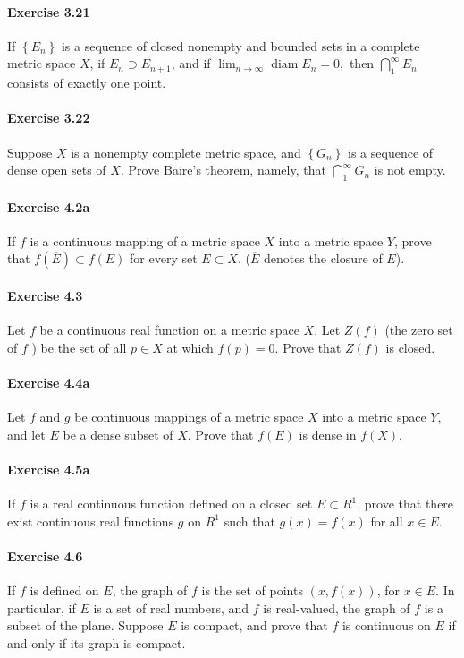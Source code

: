 \documentclass{article}
\begin{document}
\paragraph{Exercise 3.21} If $\left\{E_{n}\right\}$ is a sequence of closed nonempty and bounded sets in a complete metric space $X$, if $E_{n} \supset E_{n+1}$, and if $\lim _{n \rightarrow \infty} \operatorname{diam} E_{n}=0,$ then $\bigcap_{1}^{\infty} E_{n}$ consists of exactly one point.

\paragraph{Exercise 3.22} Suppose $X$ is a nonempty complete metric space, and $\left\{G_{n}\right\}$ is a sequence of dense open sets of $X$. Prove Baire's theorem, namely, that $\bigcap_{1}^{\infty} G_{n}$ is not empty.

\paragraph{Exercise 4.2a} If $f$ is a continuous mapping of a metric space $X$ into a metric space $Y$, prove that $f(\overline{E}) \subset \overline{f(E)}$ for every set $E \subset X$. ($\overline{E}$ denotes the closure of $E$).

\paragraph{Exercise 4.3} Let $f$ be a continuous real function on a metric space $X$. Let $Z(f)$ (the zero set of $f$ ) be the set of all $p \in X$ at which $f(p)=0$. Prove that $Z(f)$ is closed.

\paragraph{Exercise 4.4a} Let $f$ and $g$ be continuous mappings of a metric space $X$ into a metric space $Y$, and let $E$ be a dense subset of $X$. Prove that $f(E)$ is dense in $f(X)$.

\paragraph{Exercise 4.5a} If $f$ is a real continuous function defined on a closed set $E \subset R^{1}$, prove that there exist continuous real functions $g$ on $R^{1}$ such that $g(x)=f(x)$ for all $x \in E$.

\paragraph{Exercise 4.6} If $f$ is defined on $E$, the graph of $f$ is the set of points $(x, f(x))$, for $x \in E$. In particular, if $E$ is a set of real numbers, and $f$ is real-valued, the graph of $f$ is a subset of the plane. Suppose $E$ is compact, and prove that $f$ is continuous on $E$ if and only if its graph is compact.
\end{document}
